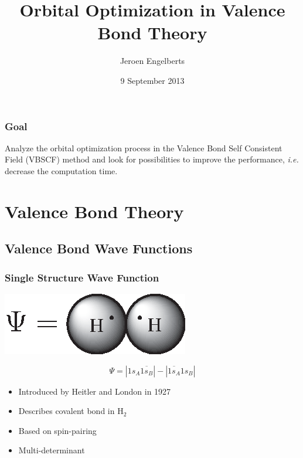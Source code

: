 \documentclass[]{beamer}
\title{Orbital Optimization in Valence Bond Theory}
\author{Jeroen Engelberts}
\date{9 September 2013}
\begin{document}
\begin{frame}
  \titlepage
\end{frame}

\begin{frame}
  \frametitle{Goal}
  Analyze the orbital optimization process in the Valence Bond Self Consistent Field (VBSCF) method and look for possibilities to improve the performance, \textit{i.e.} decrease the computation time.
\end{frame}

\begin{frame}
  \tableofcontents
\end{frame}

\section{Valence Bond Theory}

\subsection{Valence Bond Wave Functions}

\begin{frame}
  \frametitle{Single Structure Wave Function}
  \begin{center}
    \includegraphics{figures/heitler.eps}  
  \end{center}
  \begin{equation*}
    \Psi = |1s_{A}\overline{1s_{B}}| - |\overline{1s_{A}}1s_{B}|
  \end{equation*}
  \begin{itemize}
  \item<1-> Introduced by Heitler and London in 1927
  \item<2-> Describes covalent bond in H$_2$
  \item<3-> Based on spin-pairing
  \item<4-> Multi-determinant
  \end{itemize}
\end{frame}
\end{document}
